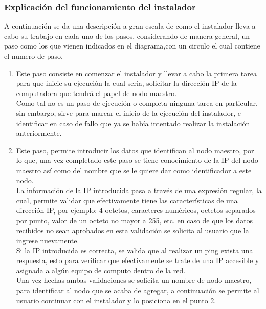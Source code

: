 \subsubsection{Explicación del funcionamiento del instalador}\label{explicacion}
A continuación se da una descripción a gran escala de como el instalador lleva a cabo su trabajo en cada uno de los pasos, considerando de manera general, un paso como los que vienen indicados en el diagrama,con un circulo el cual contiene el numero de paso.
\begin{enumerate}
	\item \label{paso1}Este paso consiste en comenzar el instalador y llevar a cabo la primera tarea para que inicie su ejecución la cual seria, solicitar la dirección IP de la computadora que tendrá el papel de nodo maestro. 
	\\
	Como tal no es un paso de ejecución o completa ninguna tarea en particular, sin embargo, sirve para marcar el inicio de la ejecución del instalador, e identificar en caso de fallo que ya se había intentado realizar la instalación anteriormente.
	\item \label{paso2} Este paso, permite introducir los datos que identifican al nodo maestro, por lo que, una vez completado este paso se tiene conocimiento de la IP del nodo maestro así como del nombre que se le quiere dar como identificador a este nodo.
	\\
	La información de la IP introducida pasa a través de una expresión regular, la cual, permite validar que efectivamente tiene las características de una dirección IP, por ejemplo: 4 octetos, caracteres numéricos, octetos separados por punto, valor de un octeto no mayor a 255, etc. en caso de que los datos recibidos no sean aprobados en esta validación se solicita al usuario que la ingrese nuevamente.
	\\
	Si la IP introducida es correcta, se valida que al realizar un ping exista una respuesta, esto para verificar que efectivamente se trate de una IP accesible y asignada a algún equipo de computo dentro de la red.
	\\
	Una vez hechas ambas validaciones se solicita un nombre de nodo maestro, para identificar al nodo que se acaba de agregar, a continuación se permite al usuario continuar con el instalador y lo posiciona en el punto 2.
	

\end{enumerate}
